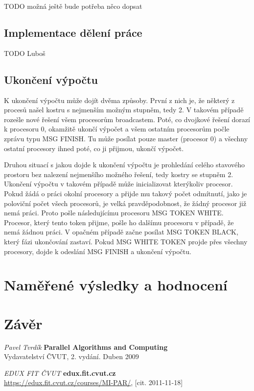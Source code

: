\documentclass[]{article}
\begin{document}
TODO možná ještě bude potřeba něco dopsat

\subsection{Implementace dělení práce}

TODO Luboš

\subsection{Ukončení výpočtu}

K ukončení výpočtu může dojít dvěma způsoby. První z nich je, že některý z procesů našel kostru s nejmenším možným stupněm, tedy 2. V takovém případě rozešle nové řešení všem procesorům broadcastem. Poté, co dvojkové řešení dorazí k procesoru 0, okamžitě ukončí výpočet a všem ostatním procesorům počle zprávu typu MSG FINISH. Tu může posílat pouze master (procesor 0) a všechny ostatní procesory ihned poté, co ji přijmou, ukončí výpočet.

Druhou situací s jakou dojde k ukončení výpočtu je prohledání celého stavového prostoru bez nalezení nejmenšího možného řešení, tedy kostry se stupněm 2. Ukončení výpočtu v takovém případě může inicializovat kterýkoliv procesor. Pokud žádá o práci okolní procesory a přijde mu takový počet odmítnutí, jako je poloviční počet všech procesorů, je velká pravděpodobnost, že žádný procesor již nemá práci. Proto pošle následujícímu procesoru MSG TOKEN WHITE. Procesor, který tento token přijme, pošle ho dalšímu procesoru v případě, že nemá žádnou práci. V opačném případě začne posílat MSG TOKEN BLACK, který fázi ukončování zastaví. Pokud MSG WHITE TOKEN projde přes všechny procesory, dojde k odeslání MSG FINISH a ukončení výpočtu.

\section{Naměřené výsledky a hodnocení}

\section{Závěr}

\newpage
\begin{thebibliography}{9}

{\em Pavel Tvrdík}
       {\bf Parallel Algorithms and Computing}\\
		Vydavatelství ČVUT, 2. vydání. Duben 2009

{\em EDUX FIT ČVUT}
       {\bf edux.fit.cvut.cz}\\
       \url{https://edux.fit.cvut.cz/courses/MI-PAR/}, [cit. 2011-11-18]
       
 \end{thebibliography}
\end{document}
